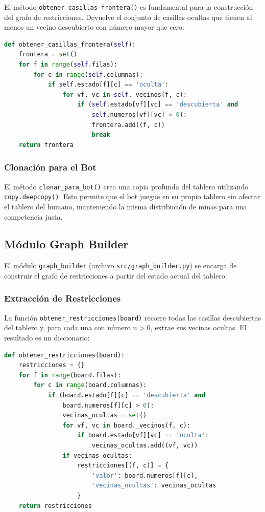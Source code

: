 \documentclass[12pt,a4paper]{article}
\begin{document}
El método \texttt{obtener\_casillas\_frontera()} es fundamental para la construcción del grafo de restricciones. Devuelve el conjunto de casillas ocultas que tienen al menos un vecino descubierto con número mayor que cero:

\begin{lstlisting}[language=Python, caption={Extracción de casillas frontera.}]
def obtener_casillas_frontera(self):
    frontera = set()
    for f in range(self.filas):
        for c in range(self.columnas):
            if self.estado[f][c] == 'oculta':
                for vf, vc in self._vecinos(f, c):
                    if (self.estado[vf][vc] == 'descubierta' and
                        self.numeros[vf][vc] > 0):
                        frontera.add((f, c))
                        break
    return frontera
\end{lstlisting}

\subsubsection{Clonación para el Bot}

El método \texttt{clonar\_para\_bot()} crea una copia profunda del tablero utilizando \texttt{copy.deepcopy()}. Esto permite que el bot juegue en su propio tablero sin afectar el tablero del humano, manteniendo la misma distribución de minas para una competencia justa.

\subsection{Módulo Graph Builder}

El módulo \texttt{graph\_builder} (archivo \texttt{src/graph\_builder.py}) se encarga de construir el grafo de restricciones a partir del estado actual del tablero.

\subsubsection{Extracción de Restricciones}

La función \texttt{obtener\_restricciones(board)} recorre todas las casillas descubiertas del tablero y, para cada una con número $n > 0$, extrae sus vecinas ocultas. El resultado es un diccionario:

\begin{lstlisting}[language=Python, caption={Extracción de restricciones.}]
def obtener_restricciones(board):
    restricciones = {}
    for f in range(board.filas):
        for c in range(board.columnas):
            if (board.estado[f][c] == 'descubierta' and
                board.numeros[f][c] > 0):
                vecinas_ocultas = set()
                for vf, vc in board._vecinos(f, c):
                    if board.estado[vf][vc] == 'oculta':
                        vecinas_ocultas.add((vf, vc))
                if vecinas_ocultas:
                    restricciones[(f, c)] = {
                        'valor': board.numeros[f][c],
                        'vecinas_ocultas': vecinas_ocultas
                    }
    return restricciones
\end{lstlisting}
\end{document}

